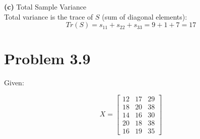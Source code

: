 \documentclass{article}
\begin{document}
\vspace{1em}
\noindent \textbf{(c)} Total Sample Variance \\
Total variance is the trace of $S$ (sum of diagonal elements):
\[
Tr(S) = s_{11} + s_{22} + s_{33} = 9 + 1 + 7 = 17
\]

\hrulefill

\section*{Problem 3.9}
Given:

\[
X = \begin{bmatrix} 12 & 17 & 29 \\ 18 & 20 & 38 \\ 14 & 16 & 30 \\ 20 & 18 & 38 \\ 16 & 19 & 35 \end{bmatrix}
\]
\end{document}
